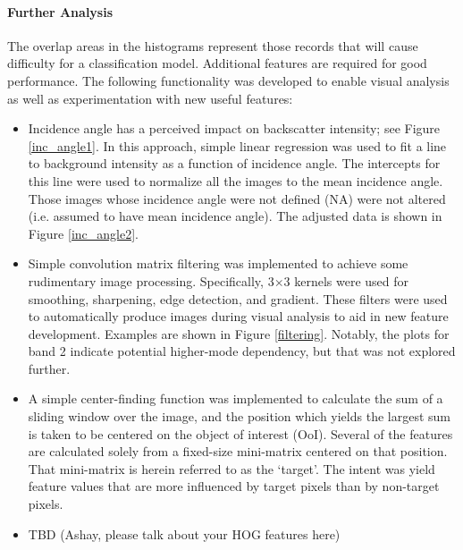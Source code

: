 \documentclass[fleqn,10pt]{SelfArx} %
\begin{document}
\paragraph{Further Analysis} The overlap areas in the histograms represent those records that will cause difficulty for a classification model. Additional features are required for good performance.  The following functionality was developed to enable visual analysis as well as experimentation with new useful features:

\begin{itemize}
	\item Incidence angle has a perceived impact on backscatter intensity; see Figure \ref{inc_angle1}.  In this approach, simple linear regression was used to fit a line to background intensity as a function of incidence angle.  The intercepts for this line were used to normalize all the images to the mean incidence angle.  Those images whose incidence angle were not defined (NA) were not altered (i.e. assumed to have mean incidence angle).  The adjusted data is shown in Figure \ref{inc_angle2}.
	
	\item Simple convolution matrix filtering was implemented to achieve some rudimentary image processing.  Specifically, 3$\times$3 kernels were used for smoothing, sharpening, edge detection, and gradient. \cite{polarimetric} These filters were used to automatically produce images during visual analysis to aid in new feature development.  Examples are shown in Figure \ref{filtering}.  Notably, the plots for band 2 indicate potential higher-mode dependency, but that was not explored further.
	
	\item A simple center-finding function was implemented to calculate the sum of a sliding window over the image, and the position which yields the largest sum is taken to be centered on the object of interest (OoI).  Several of the features are calculated solely from a fixed-size mini-matrix centered on that position.  That mini-matrix is herein referred to as the `target'.  The intent was yield feature values that are more influenced by target pixels than by non-target pixels.
	
	\item TBD (Ashay, please talk about your HOG features here)
\end{itemize}
\end{document}
